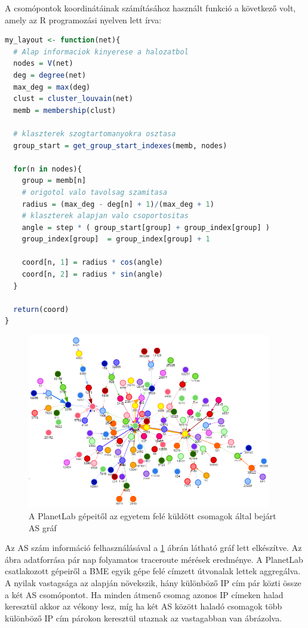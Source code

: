 \pagebreak

A csomópontok koordinátáinak számításához használt funkció a következő volt, amely az R programozási nyelven lett írva:

\begin{lstlisting}[language=R]
my_layout <- function(net){
  # Alap informaciok kinyerese a halozatbol
  nodes = V(net)
  deg = degree(net)
  max_deg = max(deg)
  clust = cluster_louvain(net)
  memb = membership(clust)
  
  # klaszterek szogtartomanyokra osztasa
  group_start = get_group_start_indexes(memb, nodes)
  
  for(n in nodes){
    group = memb[n]
    # origotol valo tavolsag szamitasa
    radius = (max_deg - deg[n] + 1)/(max_deg + 1)
    # klaszterek alapjan valo csoportositas
    angle = step * ( group_start[group] + group_index[group] )
    group_index[group]  = group_index[group] + 1
    
    coord[n, 1] = radius * cos(angle)
    coord[n, 2] = radius * sin(angle)
  }
  
  return(coord)
}
\end{lstlisting}


\pagebreak

\begin{figure}[h!]
	\centering
	\includegraphics[width=0.95\textwidth, keepaspectratio]{figures/as-graph.png}
	\caption{A PlanetLab gépeitől az egyetem felé küldött csomagok által bejárt AS gráf}
	\label{fig:as-graph}
\end{figure}


Az AS szám információ felhasználásával a \ref{fig:as-graph} ábrán látható gráf lett elkészítve. Az ábra adatforrása pár nap folyamatos traceroute mérések eredménye. A PlanetLab csatlakozott gépeiről a BME egyik gépe felé címzett útvonalak lettek aggregálva. A nyilak vastagsága az alapján növekszik, hány különböző IP cím pár közti össze a két AS csomópontot. Ha minden átmenő csomag azonos IP címeken halad keresztül akkor az vékony lesz, míg ha két AS között haladó csomagok több különböző IP cím párokon keresztül utaznak az vastagabban van ábrázolva.

